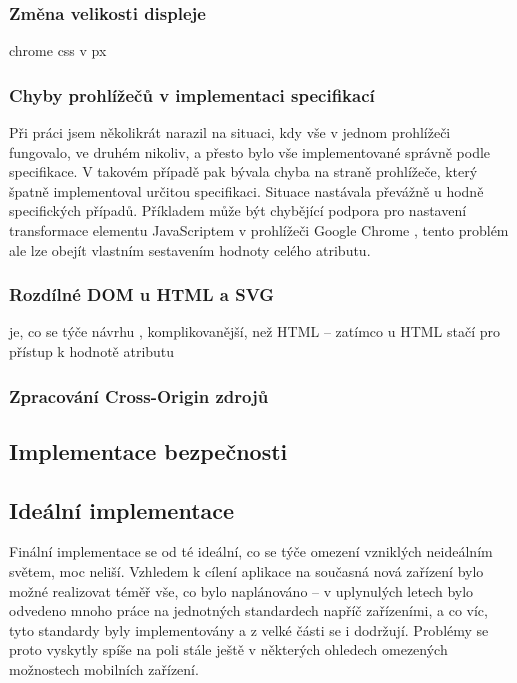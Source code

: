 \subsubsection{Změna velikosti displeje}
chrome css v px

\subsubsection{Chyby prohlížečů v implementaci specifikací}
Při práci jsem několikrát narazil na situaci, kdy vše v jednom prohlížeči fungovalo, ve druhém nikoliv, a přesto bylo vše implementované správně podle specifikace. V takovém případě pak bývala chyba na straně prohlížeče, který špatně implementoval určitou specifikaci. Situace nastávala převážně u hodně specifických případů. Příkladem může být chybějící podpora pro nastavení transformace  elementu JavaScriptem v prohlížeči Google Chrome \cite{BugChromeTran}, tento problém ale lze obejít vlastním sestavením hodnoty celého atributu. 

\subsubsection{Rozdílné DOM u HTML a SVG}
 je, co se týče návrhu , komplikovanější, než HTML -- zatímco u HTML stačí pro přístup k hodnotě atributu 

\subsubsection{Zpracování Cross-Origin zdrojů}
\label{sec:cross-origin}



\subsection{Implementace bezpečnosti}



\subsection{Ideální implementace}
Finální implementace se od té ideální, co se týče omezení vzniklých neideálním světem, moc neliší. Vzhledem k cílení aplikace na současná nová zařízení bylo možné realizovat téměř vše, co bylo naplánováno -- v uplynulých letech bylo odvedeno mnoho práce na jednotných standardech napříč zařízeními, a co víc, tyto standardy byly implementovány a z velké části se i dodržují. Problémy se proto vyskytly spíše na poli stále ještě v některých ohledech omezených možnostech mobilních zařízení.

